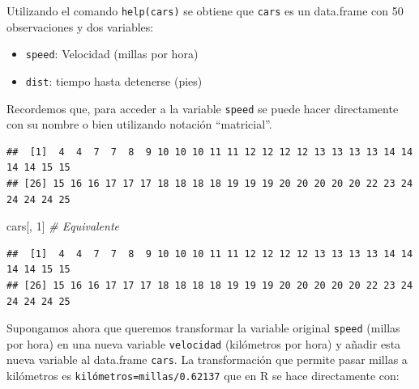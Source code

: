 \documentclass[
]{book}
\newenvironment{Shaded}{\begin{snugshade}}{\end{snugshade}}
\newcommand{\CommentTok}[1]{\textcolor[rgb]{0.56,0.35,0.01}{\textit{#1}}}
\newcommand{\DecValTok}[1]{\textcolor[rgb]{0.00,0.00,0.81}{#1}}
\newcommand{\FloatTok}[1]{\textcolor[rgb]{0.00,0.00,0.81}{#1}}
\newcommand{\NormalTok}[1]{#1}
\newcommand{\SpecialCharTok}[1]{\textcolor[rgb]{0.00,0.00,0.00}{#1}}
\theoremstyle{break}
\theoremstyle{nonumberplain}
\begin{document}
Utilizando el comando \texttt{help(cars)}
se obtiene que \texttt{cars} es un data.frame con 50 observaciones y dos
variables:

\begin{itemize}
\item
  \texttt{speed}: Velocidad (millas por hora)
\item
  \texttt{dist}: tiempo hasta detenerse (pies)
\end{itemize}

Recordemos que, para acceder a la variable \texttt{speed} se puede
hacer directamente con su nombre o bien utilizando notación
``matricial''.

\begin{Shaded}
\end{Shaded}

\begin{verbatim}
##  [1]  4  4  7  7  8  9 10 10 10 11 11 12 12 12 12 13 13 13 13 14 14 14 14 15 15
## [26] 15 16 16 17 17 17 18 18 18 18 19 19 19 20 20 20 20 20 22 23 24 24 24 24 25
\end{verbatim}

\begin{Shaded}
\begin{Highlighting}[]
\NormalTok{cars[, }\DecValTok{1}\NormalTok{]  }\CommentTok{\# Equivalente}
\end{Highlighting}
\end{Shaded}

\begin{verbatim}
##  [1]  4  4  7  7  8  9 10 10 10 11 11 12 12 12 12 13 13 13 13 14 14 14 14 15 15
## [26] 15 16 16 17 17 17 18 18 18 18 19 19 19 20 20 20 20 20 22 23 24 24 24 24 25
\end{verbatim}

Supongamos ahora que queremos transformar la variable original \texttt{speed}
(millas por hora) en una nueva variable \texttt{velocidad} (kilómetros por
hora) y añadir esta nueva variable al data.frame \texttt{cars}.
La transformación que permite pasar millas a kilómetros es
\texttt{kilómetros=millas/0.62137} que en R se hace directamente con:

\begin{Shaded}
\end{Shaded}
\end{document}
